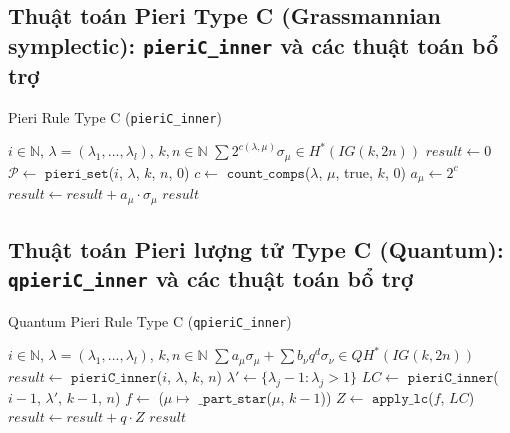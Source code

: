 
\subsection*{Thuật toán Pieri Type C (Grassmannian symplectic): \texttt{pieriC\_inner} và các thuật toán bổ trợ}

\begin{algorithm}[H]
\caption{Pieri Rule Type C (\texttt{pieriC\_inner})}
\begin{algorithmic}[1]
\REQUIRE $i \in \mathbb{N}$, $\lambda = (\lambda_1, ..., \lambda_l)$, $k, n \in \mathbb{N}$
\ENSURE $\sum 2^{c(\lambda,\mu)} \sigma_\mu \in H^*(IG(k,2n))$
\STATE $result \gets 0$
\STATE $\mathcal{P} \gets$ $\mathtt{pieri\_set}$($i$, $\lambda$, $k$, $n$, $0$)
    \STATE $c \gets$ $\mathtt{count\_comps}$($\lambda$, $\mu$, true, $k$, $0$)
    \STATE $a_\mu \gets 2^c$
    \STATE $result \gets result + a_\mu \cdot \sigma_\mu$
\ENDFOR
\RETURN $result$
\end{algorithmic}
\end{algorithm}

\subsection*{Thuật toán Pieri lượng tử Type C (Quantum): \texttt{qpieriC\_inner} và các thuật toán bổ trợ}

\begin{algorithm}[H]
\caption{Quantum Pieri Rule Type C (\texttt{qpieriC\_inner})}
\begin{algorithmic}[1]
\REQUIRE $i \in \mathbb{N}$, $\lambda = (\lambda_1, ..., \lambda_l)$, $k, n \in \mathbb{N}$
\ENSURE $\sum a_\mu \sigma_\mu + \sum b_\nu q^d \sigma_\nu \in QH^*(IG(k,2n))$
\STATE $result \gets$ $\mathtt{pieriC\_inner}$($i$, $\lambda$, $k$, $n$)
    \STATE $\lambda' \gets \{\lambda_j - 1 : \lambda_j > 1\}$
    \STATE $LC \gets$ $\mathtt{pieriC\_inner}$($i-1$, $\lambda'$, $k-1$, $n$)
    \STATE $f \gets$ ($\mu \mapsto$ $\mathtt{\_part\_star}$($\mu$, $k-1$))
    \STATE $Z \gets$ $\mathtt{apply\_lc}$($f$, $LC$)
    \STATE $result \gets result + q \cdot Z$
\ENDIF
\RETURN $result$
\end{algorithmic}
\end{algorithm}

